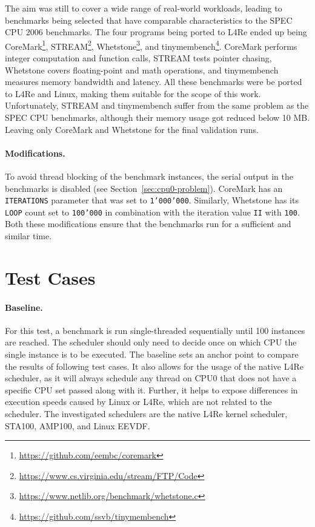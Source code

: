 The aim was still to cover a wide range of real-world workloads, leading to benchmarks being selected that have comparable characteristics to the SPEC CPU 2006 benchmarks.
The four programs being ported to L4Re ended up being CoreMark\footnote{\url{https://github.com/eembc/coremark}}, STREAM\footnote{\url{https://www.cs.virginia.edu/stream/FTP/Code}}, Whetstone\footnote{\url{https://www.netlib.org/benchmark/whetstone.c}}, and tinymembench\footnote{\url{https://github.com/ssvb/tinymembench}}.
CoreMark performs integer computation and function calls, STREAM tests pointer chasing, Whetstone covers floating-point and math operations, and tinymembench measures memory bandwidth and latency.
All these benchmarks were be ported to L4Re and Linux, making them suitable for the scope of this work.
Unfortunately, STREAM and tinymembench suffer from the same problem as the SPEC CPU benchmarks, although their memory usage got reduced below 10 MB.
Leaving only CoreMark and Whetstone for the final validation runs.

\paragraph{Modifications.}

To avoid thread blocking of the benchmark instances, the serial output in the benchmarks is disabled (see Section~\ref{sec:cpu0-problem}).
CoreMark has an \texttt{ITERATIONS} parameter that was set to \texttt{1'000'000}.
Similarly, Whetstone has its \texttt{LOOP} count set to \texttt{100'000} in combination with the iteration value \texttt{II} with \texttt{100}.
Both these modifications ensure that the benchmarks run for a sufficient and similar time.

\section{Test Cases}
\label{sec:test-cases}

\paragraph{Baseline.}

For this test, a benchmark is run single-threaded sequentially until 100 instances are reached.
The scheduler should only need to decide once on which CPU the single instance is to be executed.
The baseline sets an anchor point to compare the results of following test cases.
It also allows for the usage of the native L4Re scheduler, as it will always schedule any thread on CPU0 that does not have a specific CPU set passed along with it.
Further, it helps to expose differences in execution speeds caused by Linux or L4Re, which are not related to the scheduler.
The investigated schedulers are the native L4Re kernel scheduler, STA100, AMP100, and Linux EEVDF.

